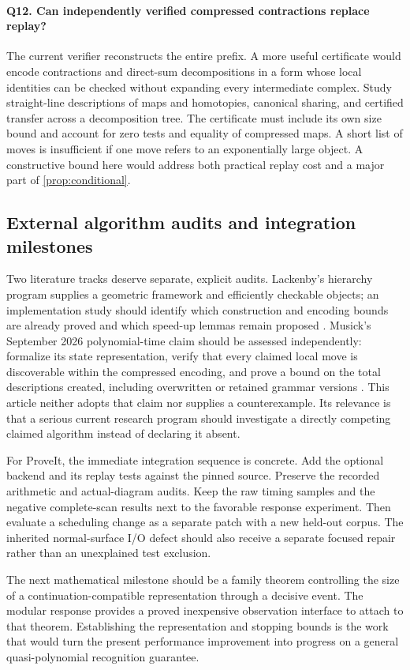 \paragraph{Q12. Can independently verified compressed contractions replace replay?}
The current verifier reconstructs the entire prefix. A more useful certificate
would encode contractions and direct-sum decompositions in a form whose local
identities can be checked without expanding every intermediate complex. Study
straight-line descriptions of maps and homotopies, canonical sharing, and
certified transfer across a decomposition tree. The certificate must include
its own size bound and account for zero tests and equality of compressed maps.
A short list of moves is insufficient if one move refers to an exponentially
large object. A constructive bound here would address both practical replay
cost and a major part of \cref{prop:conditional}.

\subsection{External algorithm audits and integration milestones}

Two literature tracks deserve separate, explicit audits. Lackenby's hierarchy
program supplies a geometric framework and efficiently checkable objects;
an implementation study should identify which construction and encoding bounds
are already proved and which speed-up lemmas remain proposed
\cite{lackenby2026,lackenbytalk}. Musick's September 2026 polynomial-time claim
should be assessed independently: formalize its state representation, verify
that every claimed local move is discoverable within the compressed encoding,
and prove a bound on the total descriptions created, including overwritten
or retained grammar versions \cite{musick}. This article neither adopts that
claim nor supplies a counterexample. Its relevance is that a serious current
research program should investigate a directly competing claimed algorithm
instead of declaring it absent.

For ProveIt, the immediate integration sequence is concrete. Add the optional
backend and its replay tests against the pinned source. Preserve the recorded
arithmetic and actual-diagram audits. Keep the raw timing samples and the
negative complete-scan results next to the favorable response experiment.
Then evaluate a scheduling change as a separate patch with a new held-out
corpus. The inherited normal-surface I/O defect should also receive a separate
focused repair rather than an unexplained test exclusion.

The next mathematical milestone should be a family theorem controlling the
size of a continuation-compatible representation through a decisive event.
The modular response provides a proved inexpensive observation interface to
attach to that theorem. Establishing the representation and stopping bounds
is the work that would turn the present performance improvement into progress
on a general quasi-polynomial recognition guarantee.
